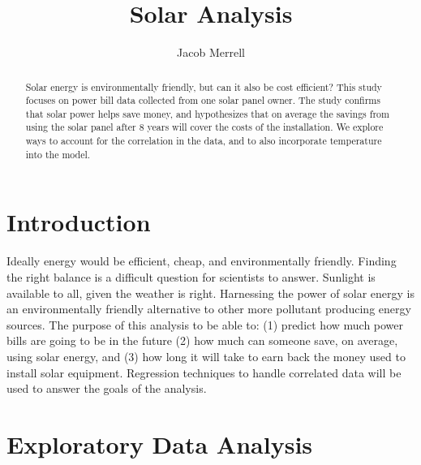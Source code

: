 \documentclass{svproc}
\begin{document}
\mainmatter              %
%


\title{Solar Analysis}
%
%
\author{Jacob Merrell}

\institute{}
%

\maketitle  

\begin{abstract}
   Solar energy is environmentally friendly, but can it also be cost efficient? This study focuses on power bill data collected from one solar panel owner. The study confirms that solar power helps save money, and hypothesizes that on average the savings from using the solar panel after 8 years will cover the costs of the installation. We explore ways to account for the correlation in the data, and to also incorporate temperature into the model.   
\end{abstract}

\section{Introduction}

Ideally energy would be efficient, cheap, and environmentally friendly. Finding the right balance is a difficult question for scientists to answer. Sunlight is available to all, given the weather is right. Harnessing the power of solar energy is an environmentally friendly alternative to other more pollutant producing energy sources. The purpose of this analysis to be able to: (1) predict how much power bills are going to be in the future (2) how much can someone save, on average, using solar energy, and (3) how long it will take to earn back the money used to install solar equipment. Regression techniques to handle correlated data will be used to answer the goals of the analysis.

\section{Exploratory Data Analysis}
\end{document}
